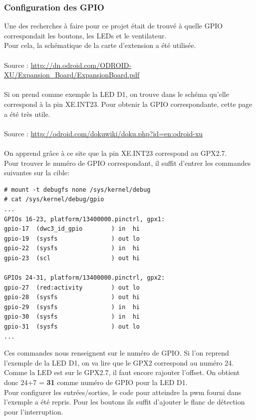 \subsubsection{Configuration des GPIO}
Une des recherches à faire pour ce projet était de trouvé à quelle GPIO correspondait les boutons, les LEDs et le ventilateur.\\
Pour cela, la schématique de la carte d'extension a été utilisée.\\\\
Source : \url{http://dn.odroid.com/ODROID-XU/Expansion_Board/ExpansionBoard.pdf}\\\\
Si on prend comme exemple la LED D1, on trouve dans le schéma qu'elle correspond à la pin XE.INT23. Pour obtenir la GPIO correspondante, cette page a été très utile.\\\\
Source : \url{http://odroid.com/dokuwiki/doku.php?id=en:odroid-xu}\\\\
On apprend grâce à ce site que la pin XE.INT23 correspond au GPX2.7.\\
Pour trouver le numéro de GPIO correspondant, il suffit d'entrer les commandes suivantes sur la cible:
\begin{lstlisting}
# mount -t debugfs none /sys/kernel/debug                                       
# cat /sys/kernel/debug/gpio                                                    
...
GPIOs 16-23, platform/13400000.pinctrl, gpx1:                                   
gpio-17  (dwc3_id_gpio        ) in  hi                                         
gpio-19  (sysfs               ) out lo                                         
gpio-22  (sysfs               ) in  hi                                         
gpio-23  (scl                 ) out hi                                         

GPIOs 24-31, platform/13400000.pinctrl, gpx2:                                   
gpio-27  (red:activity        ) out lo                                         
gpio-28  (sysfs               ) out hi                                         
gpio-29  (sysfs               ) in  hi                                         
gpio-30  (sysfs               ) in  hi                                         
gpio-31  (sysfs               ) out lo                                         
...   
\end{lstlisting}
Ces commandes nous renseignent sur le numéro de GPIO. Si l'on reprend l'exemple de la LED D1, on va lire que le GPX2 correspond au numéro 24. Comme la LED est sur le GPX2.7, il faut encore rajouter l'offset. On obtient donc 24+7 = \textbf{31} comme numéro de GPIO pour la LED D1.\\
Pour configurer les entrées/sorties, le code pour atteindre la pwm fourni dans l'exemple a été repris. Pour les boutons ils suffit d'ajouter le flanc de détection pour l'interruption.

